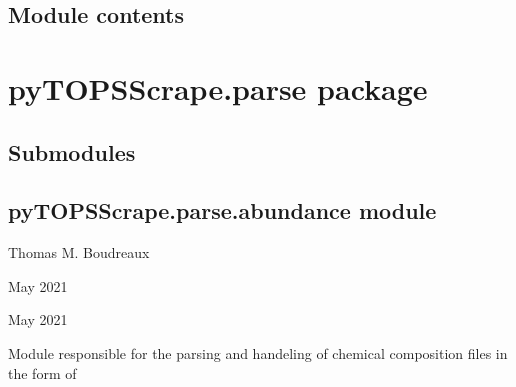 \documentclass[letterpaper,10pt,english]{sphinxmanual}
\begin{document}
\section{Module contents}
\label{\detokenize{pyTOPSScrape.ext:module-pyTOPSScrape.ext}}\label{\detokenize{pyTOPSScrape.ext:module-contents}}

\chapter{pyTOPSScrape.parse package}
\label{\detokenize{pyTOPSScrape.parse:pytopsscrape-parse-package}}\label{\detokenize{pyTOPSScrape.parse::doc}}

\section{Submodules}
\label{\detokenize{pyTOPSScrape.parse:submodules}}

\section{pyTOPSScrape.parse.abundance module}
\label{\detokenize{pyTOPSScrape.parse:module-pyTOPSScrape.parse.abundance}}\label{\detokenize{pyTOPSScrape.parse:pytopsscrape-parse-abundance-module}}
\sphinxAtStartPar
{} Thomas M. Boudreaux

\sphinxAtStartPar
{} May 2021

\sphinxAtStartPar
{} May 2021

\sphinxAtStartPar
Module responsible for the parsing and handeling of chemical composition files
in the form of
\end{document}
